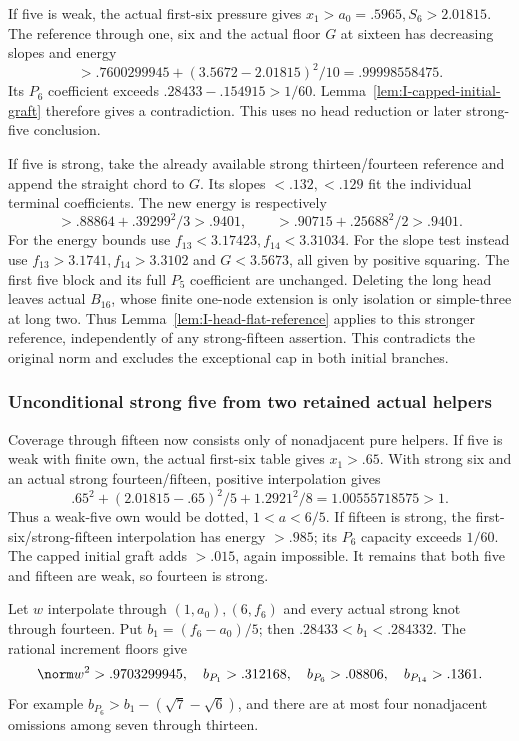 If five is weak, the actual first-six pressure gives
\(x_1>a_0=.5965,S_6>2.01815\).
The reference through one, six and the actual floor \(G\) at sixteen
has decreasing slopes and energy
\[
 >.7600299945+(3.5672-2.01815)^2/10
 =.99998558475.
\]
Its \(P_6\) coefficient exceeds \(.28433-.154915>1/60\).
Lemma~\ref{lem:I-capped-initial-graft} therefore gives a contradiction.
This uses no head reduction or later strong-five conclusion.

If five is strong, take the already available strong thirteen/fourteen
reference and append the straight chord to \(G\). Its slopes
\(<.132,<.129\) fit the individual terminal coefficients.
The new energy is respectively
\[
 >.88864+.39299^2/3>.9401,\qquad
 >.90715+.25688^2/2>.9401.
\]
For the energy bounds use \(f_{13}<3.17423,f_{14}<3.31034\).
For the slope test instead use \(f_{13}>3.1741,f_{14}>3.3102\)
and \(G<3.5673\), all given by positive squaring.
The first five block and its full \(P_5\) coefficient are unchanged.
Deleting the long head leaves actual \(B_{16}\), whose finite
one-node extension is only isolation or simple-three at long two.
Thus Lemma~\ref{lem:I-head-flat-reference} applies to this stronger
reference, independently of any strong-fifteen assertion.
This contradicts the original norm and excludes the exceptional cap
in both initial branches.

\subsubsection{Unconditional strong five from two retained actual helpers}
Coverage through fifteen now consists only of nonadjacent pure helpers.
If five is weak with finite own, the actual first-six table gives
\(x_1>.65\). With strong six and an actual strong fourteen/fifteen,
positive interpolation gives
\[
 .65^2+(2.01815-.65)^2/5+1.2921^2/8
 =1.00555718575>1.
\]
Thus a weak-five own would be dotted, \(1<a<6/5\).
If fifteen is strong, the first-six/strong-fifteen interpolation has
energy \(>.985\); its \(P_6\) capacity exceeds \(1/60\).
The capped initial graft adds \(>.015\), again impossible.
It remains that both five and fifteen are weak, so fourteen is strong.

Let \(w\) interpolate through \((1,a_0),(6,f_6)\) and every
actual strong knot through fourteen. Put \(b_1=(f_6-a_0)/5\);
then \(.28433<b_1<.284332\). The rational increment floors give
\[
 \norm w^2>.9703299945,\quad
 b_{P_1}>.312168,\quad b_{P_6}>.08806,\quad b_{P_{14}}>.1361.
\]
For example \(b_{P_6}>b_1-(\sqrt7-\sqrt6)\), and there are
at most four nonadjacent omissions among seven through thirteen.

